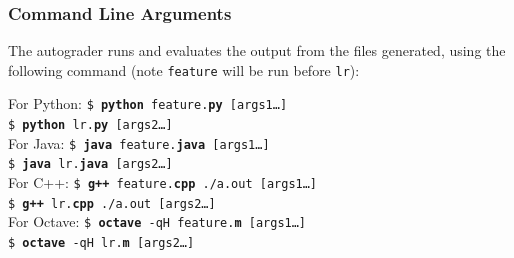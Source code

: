 \documentclass[11pt]{article}
\numberwithin{equation}{section} %
\numberwithin{figure}{section} %
\numberwithin{table}{section} %
\begin{document}
\subsubsection{Command Line Arguments}
The autograder runs and evaluates the output from the files generated, using the following command (note \lstinline{feature} will be run before \lstinline{lr}):

\begin{tabbing}
For Python: \=\texttt{\$ \textbf{python} feature.\textbf{py} [args1\dots]}\\
\>\texttt{\$ \textbf{python} lr.\textbf{py} [args2\dots]}\\
For Java: \>\texttt{\$ \textbf{java} feature.\textbf{java} [args1\dots]}\\
\>\texttt{\$ \textbf{java} lr.\textbf{java} [args2\dots]}\\
For C++: \>\texttt{\$ \textbf{g++} feature.\textbf{cpp} ./a.out [args1\dots]}\\
\>\texttt{\$ \textbf{g++} lr.\textbf{cpp} ./a.out [args2\dots]}\\
For Octave: \>\texttt{\$ \textbf{octave} -qH feature.\textbf{m} [args1\dots]}\\
\>\texttt{\$ \textbf{octave} -qH lr.\textbf{m} [args2\dots]}
\end{tabbing}
\end{document}
